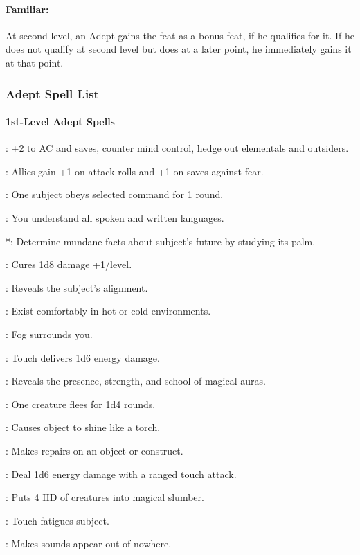 \paragraph{Familiar:}
At second level, an Adept gains the  feat as a bonus feat, if he qualifies for it.
If he does not qualify at second level but does at a later point, he immediately gains it at that point.

\subsubsection{Adept Spell List}
\paragraph{1st-Level Adept Spells}
\begin{list}{}{\leftmargin=1em}
\item {}: +2 to AC and saves, counter mind control, hedge out elementals and outsiders.
\item {}: Allies gain +1 on attack rolls and +1 on saves against fear.
\item {}: One subject obeys selected command for 1 round.
\item {}: You understand all spoken and written languages.
\item {}*: Determine mundane facts about subject's future by studying its palm.
\item {}: Cures 1d8 damage +1/level.
\item {}: Reveals the subject's alignment.
\item {}: Exist comfortably in hot or cold environments.
\item {}: Fog surrounds you.
\item {}: Touch delivers 1d6 energy damage.
\item {}: Reveals the presence, strength, and school of magical auras.
\item {}: One creature flees for 1d4 rounds.
\item {}: Causes object to shine like a torch.
\item {}: Makes repairs on an object or construct.
\item {}: Deal 1d6 energy damage with a ranged touch attack.
\item {}: Puts 4 HD of creatures into magical slumber.
\item {}: Touch fatigues subject.
\item {}: Makes sounds appear out of nowhere.
\end{list}
